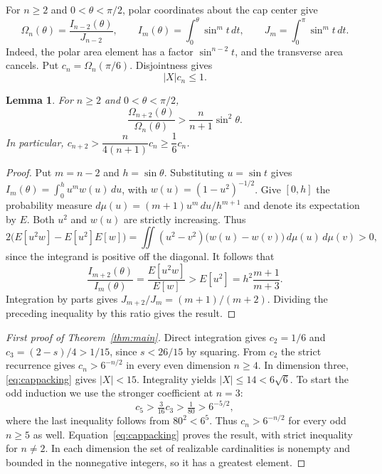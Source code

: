 \documentclass[11pt,a4paper]{article}
\newtheorem{lemma}[theorem]{Lemma}
\theoremstyle{remark}
\begin{document}
For $n\geq2$ and $0<\theta<\pi/2$, polar coordinates about the cap center give
\begin{equation}\label{eq:capfraction}
 \Omega_n(\theta)=\frac{I_{n-2}(\theta)}{J_{n-2}},\qquad
 I_m(\theta)=\int_0^\theta\sin^m t\,dt,\qquad J_m=\int_0^\pi\sin^m t\,dt.
\end{equation}
Indeed, the polar area element has a factor $\sin^{n-2}t$, and the transverse area cancels. Put $c_n=\Omega_n(\pi/6)$. Disjointness gives
\begin{equation}\label{eq:cappacking}
 |X|c_n\leq1.
\end{equation}

\begin{lemma}\label{lem:caprecurrence}
For $n\geq2$ and $0<\theta<\pi/2$,
\[
 \frac{\Omega_{n+2}(\theta)}{\Omega_n(\theta)}
   >\frac{n}{n+1}\sin^2\theta.
\]
In particular, $c_{n+2}>\dfrac{n}{4(n+1)}c_n\geq\dfrac16c_n$.
\end{lemma}

\begin{proof}
Put $m=n-2$ and $h=\sin\theta$. Substituting $u=\sin t$ gives
$I_m(\theta)=\int_0^h u^m w(u)\,du$, with $w(u)=(1-u^2)^{-1/2}$.
Give $[0,h]$ the probability measure $d\mu(u)=(m+1)u^m\,du/h^{m+1}$ and denote its expectation by $E$. Both $u^2$ and $w(u)$ are strictly increasing. Thus
\[
 2\bigl(E[u^2w]-E[u^2]E[w]\bigr)
  =\iint (u^2-v^2)\bigl(w(u)-w(v)\bigr)\,d\mu(u)\,d\mu(v)>0,
\]
since the integrand is positive off the diagonal. It follows that
\[
 \frac{I_{m+2}(\theta)}{I_m(\theta)}
 =\frac{E[u^2w]}{E[w]}>E[u^2]=h^2\frac{m+1}{m+3}.
\]
Integration by parts gives $J_{m+2}/J_m=(m+1)/(m+2)$. Dividing the preceding inequality by this ratio gives the result.
\end{proof}

\begin{proof}[First proof of Theorem~\ref{thm:main}]
Direct integration gives $c_2=1/6$ and $c_3=(2-s)/4>1/15$, since $s<26/15$ by squaring. From $c_2$ the strict recurrence gives $c_n>6^{-n/2}$ in every even dimension $n\geq4$. In dimension three, \eqref{eq:cappacking} gives $|X|<15$. Integrality yields $|X|\leq14<6\sqrt6$. To start the odd induction we use the stronger coefficient at $n=3$:
\[
 c_5>\tfrac3{16}c_3>\tfrac1{80}>6^{-5/2},
\]
where the last inequality follows from $80^2<6^5$. Thus $c_n>6^{-n/2}$ for every odd $n\geq5$ as well. Equation~\eqref{eq:cappacking} proves the result, with strict inequality for $n\ne2$. In each dimension the set of realizable cardinalities is nonempty and bounded in the nonnegative integers, so it has a greatest element.
\end{proof}
\end{document}
